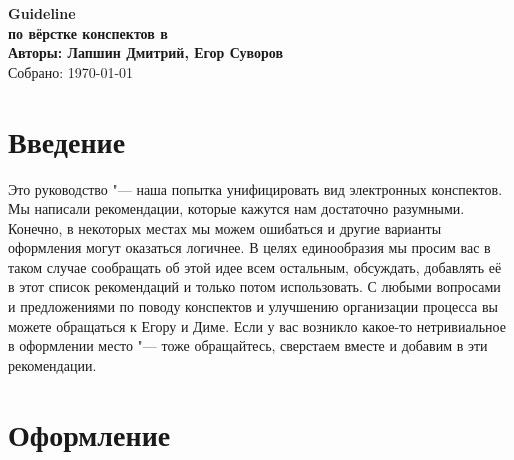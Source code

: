 \documentclass[12pt,a4paper]{book}
\begin{document}
\begin{center}
{\huge \bf Guideline} \\
{\Large \bf по вёрстке конспектов в \XeLaTeX} \\
\vspace{0.5em}
{\large \bf Авторы: Лапшин Дмитрий, Егор Суворов} \\
\vspace{0.5em}
{Собрано: \today~\currenttime} \\
\end{center}

\section{Введение}
Это руководство "--- наша попытка унифицировать вид электронных конспектов.
Мы написали рекомендации, которые кажутся нам достаточно разумными.
Конечно, в некоторых местах мы можем ошибаться и другие варианты оформления могут оказаться логичнее.
В целях единообразия мы просим вас в таком случае сообращать об этой идее всем остальным,
обсуждать, добавлять её в этот список рекомендаций и только потом использовать.
С любыми вопросами и предложениями по поводу конспектов и улучшению организации
процесса вы можете обращаться к Егору и Диме.
Если у вас возникло какое-то нетривиальное в оформлении место "--- тоже обращайтесь,
сверстаем вместе и добавим в эти рекомендации.

\section{Оформление}
\end{document}
